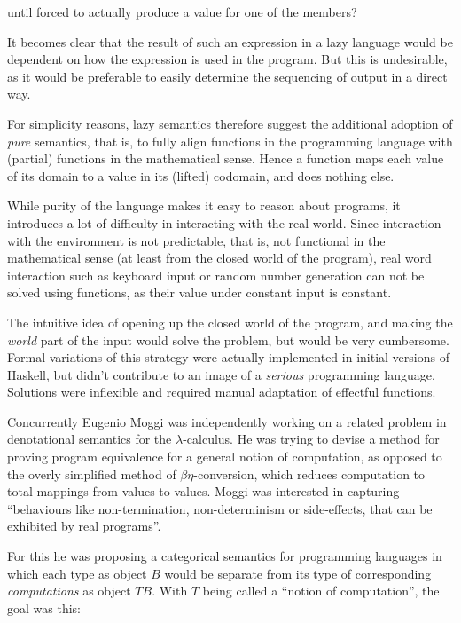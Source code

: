 until forced to actually produce a value for one of the members?

It becomes clear that the result of such an expression in a lazy
language would be dependent on how the expression is used in the
program. But this is undesirable, as it would be preferable to easily
determine the sequencing of output in a direct way.

For simplicity reasons, lazy semantics therefore suggest the additional
adoption of \emph{pure} semantics\smartcite[p. 12-8]{hask-history}, that is, to
fully align functions in the programming language with (partial) functions in
the mathematical sense.  Hence a function maps each value of its domain to a
value in its (lifted) codomain, and does nothing else.

While purity of the language makes it easy to reason about programs, it
introduces a lot of difficulty in interacting with the real world. Since
interaction with the environment is not predictable, that is, not
functional in the mathematical sense (at least from the closed world of
the program), real word interaction such as keyboard input or random
number generation can not be solved using functions, as their value
under constant input is constant.

The intuitive idea of opening up the closed world of the program, and
making the \emph{world} part of the input would solve the problem, but
would be very cumbersome. Formal variations of this strategy were
actually implemented in initial versions of Haskell, but didn't
contribute to an image of a \emph{serious} programming language.
Solutions were inflexible and required manual adaptation of effectful
functions.

Concurrently Eugenio Moggi was independently working on a related problem in
denotational semantics for the $\lambda$-calculus. He was trying to devise a
method for proving program equivalence for a general notion of computation, as
opposed to the overly simplified method of $\beta\eta$-conversion, which
reduces computation to total mappings from values to values. Moggi was
interested in capturing ``behaviours like non-termination, non-determinism or
side-effects, that can be exhibited by real programs''\smartcite[p.
1]{moggi-89}.

For this he was proposing a categorical semantics for programming languages in
which each type as object $B$ would be separate from its type of corresponding
\emph{computations} as object $TB$. With $T$ being called a ``notion of
computation'', the goal was this\smartcite[p. 2]{moggi-89}:

